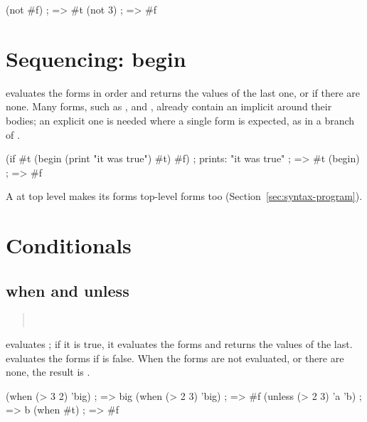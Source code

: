 \begin{dylan}
(not #f)                  ; => #t
(not 3)                   ; => #f
\end{dylan}

\section{Sequencing: begin}

 evaluates the forms in order and returns
the values of the last one, or  if there are none. Many forms,
such as ,  and , already contain an
implicit  around their bodies; an explicit one is needed where
a single form is expected, as in a branch of .

\begin{dylan}
(if #t
    (begin (print "it was true")
           #t)
    #f)                  ; prints: "it was true"
                         ; => #t
(begin)                  ; => #f
\end{dylan}

\noindent A  at top level makes its forms top-level forms too
(Section~\ref{sec:syntax-program}).

\section{Conditionals}\label{sec:control-conditionals}

\subsection{when and unless}

\begin{quote}
\\
\end{quote}

\noindent {} evaluates ; if it is true, it evaluates
the forms and returns the values of the last.  evaluates the
forms if  is false. When the forms are not evaluated, or there
are none, the result is .

\begin{dylan}
(when (> 3 2) 'big)      ; => big
(when (> 2 3) 'big)      ; => #f
(unless (> 2 3) 'a 'b)   ; => b
(when #t)                ; => #f
\end{dylan}

